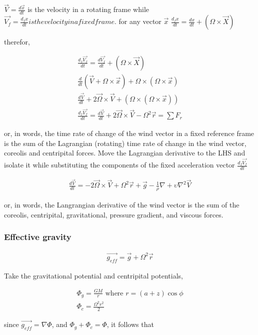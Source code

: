 \documentclass[a4paper,12pt]{article}
\begin{document}
$\vec{V} = \frac{d\vec{x}}{dt}$ is the velocity in a rotating frame while $\vec{V_f} = \frac{d_fx}{dt} is the velocity in a fixed frame$.
for any vector $\vec{x}\, \,  \frac{d_fx}{dt} = \frac{dx}{dt} + (\Omega \times \vec{X})$


therefor, 

\begin{align}
\frac{d_f\vec{V_f}}{dt} = \frac{d\vec{V_f}}{dt} + (\Omega \times \vec{X})\\
\frac{d}{dt}(\vec{V} + \Omega \times \vec{x}) + \Omega \times (\Omega \times \vec{x})\\
\frac{d\vec{V}}{dt} + 2\vec{\Omega} \times \vec{V} + (\Omega \times (\Omega \times \vec{x}))\\
\boxed{\frac{d_f\vec{V_f}}{dt} = \frac{d\vec{V}}{dt} + 2\vec{\Omega} \times \vec{V} - \Omega^2\vec{r} = \sum{F_r}}
\end{align}

or, in words, the time rate of change of the wind vector in a fixed reference frame is the sum of the Lagrangian (rotating) time rate of change in the wind vector, coreolis and centripital forces. Move the Lagrangian derivative to the LHS and isolate it while substituting the components of the fixed acceleration vector $\frac{d_f\vec{V_f}}{dt}$

\begin{align}
 \frac{d\vec{V}}{dt} = - 2\vec{\Omega} \times \vec{V} + \Omega^2\vec{r} + \vec{g} - \frac{1}{\rho}\nabla + \upsilon\nabla^2\vec{V}
\end{align}

or, in words, the Langrangian derivative of the wind vector is the sum of the coreolis, centripital, gravitational, pressure gradient, and viscous forces.

\subsubsection*{Effective gravity}
\begin{align}
\vec{g_{eff}} = \vec{g} + \Omega^2\vec{r} 
\end{align}

Take the gravitational potential and centripital potentials,

\begin{align}
\Phi_g = \frac{GM}{r} \text{ where } r = (a+z)\cos{\phi}\\
\Phi_c = \frac{\Omega^2r^2}{2}
\end{align}

since $\vec{g_{eff}} = \nabla \Phi$, and $\Phi_g + \Phi_c = \Phi$, it follows that
\end{document}
